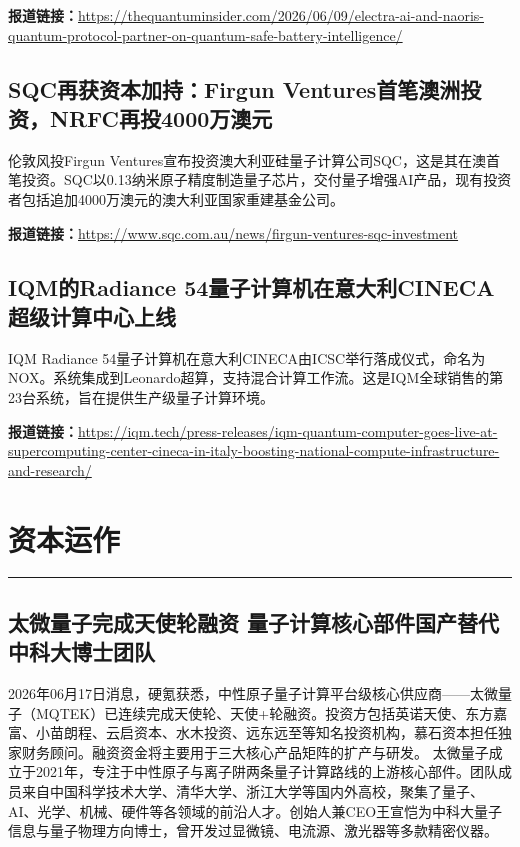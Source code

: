 \documentclass[12pt,a4paper]{ctexart}
\begin{document}
\noindent\textbf{报道链接：}\url{https://thequantuminsider.com/2026/06/09/electra-ai-and-naoris-quantum-protocol-partner-on-quantum-safe-battery-intelligence/}

\subsection{ SQC再获资本加持：Firgun Ventures首笔澳洲投资，NRFC再投4000万澳元 }

伦敦风投Firgun Ventures宣布投资澳大利亚硅量子计算公司SQC，这是其在澳首笔投资。SQC以0.13纳米原子精度制造量子芯片，交付量子增强AI产品，现有投资者包括追加4000万澳元的澳大利亚国家重建基金公司。

\noindent\textbf{报道链接：}\url{https://www.sqc.com.au/news/firgun-ventures-sqc-investment}

\subsection{ IQM的Radiance 54量子计算机在意大利CINECA超级计算中心上线 }

IQM Radiance 54量子计算机在意大利CINECA由ICSC举行落成仪式，命名为NOX。系统集成到Leonardo超算，支持混合计算工作流。这是IQM全球销售的第23台系统，旨在提供生产级量子计算环境。

\noindent\textbf{报道链接：}\url{https://iqm.tech/press-releases/iqm-quantum-computer-goes-live-at-supercomputing-center-cineca-in-italy-boosting-national-compute-infrastructure-and-research/}


\newpage
\section{资本运作}
\vspace{-0.5em}
\noindent\rule{\linewidth}{1.5pt}

\subsection{ 太微量子完成天使轮融资 量子计算核心部件国产替代 中科大博士团队 }

2026年06月17日消息，硬氪获悉，中性原子量子计算平台级核心供应商——太微量子（MQTEK）已连续完成天使轮、天使+轮融资。投资方包括英诺天使、东方嘉富、小苗朗程、云启资本、水木投资、远东远至等知名投资机构，慕石资本担任独家财务顾问。融资资金将主要用于三大核心产品矩阵的扩产与研发。 太微量子成立于2021年，专注于中性原子与离子阱两条量子计算路线的上游核心部件。团队成员来自中国科学技术大学、清华大学、浙江大学等国内外高校，聚集了量子、AI、光学、机械、硬件等各领域的前沿人才。创始人兼CEO王宣恺为中科大量子信息与量子物理方向博士，曾开发过显微镜、电流源、激光器等多款精密仪器。
\end{document}
